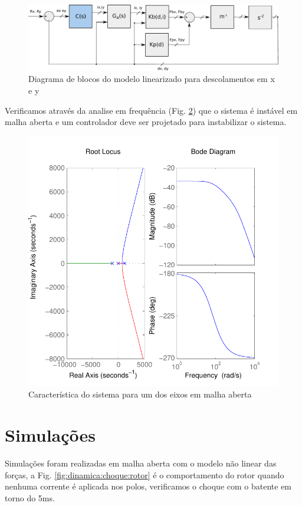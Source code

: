 \begin{figure}[th!]
\centering
\includegraphics[width=1\linewidth]{../Figs/Modelagem/diagrama_blocos_modelo_linear}
\caption{Diagrama de blocos do modelo linearizado para descolamentos em x e y}
\label{fig:diagrama:blocos:modelo:linear}
\end{figure}

Verificamos através da analise em frequência (Fig. \ref{fig:bode:rlocus:pnt:operacao}) que o sistema é instável em malha aberta e um controlador deve ser projetado para instabilizar o sistema.	

\begin{figure}[th!]
\centering
\includegraphics[width=0.7\linewidth]{./Figs/Modelagem/bode_rlocus_pnt_operacao}
\caption{Característica do sistema para um dos eixos em malha aberta}
\label{fig:bode:rlocus:pnt:operacao}
\end{figure}

\section{Simulações}

Simulações foram realizadas em malha aberta com o modelo não linear das forças,  a Fig. \ref{fig:dinamica:choque:rotor} é o comportamento do rotor quando nenhuma corrente é aplicada nos polos, verificamos  o choque com o batente em torno do 5ms.


